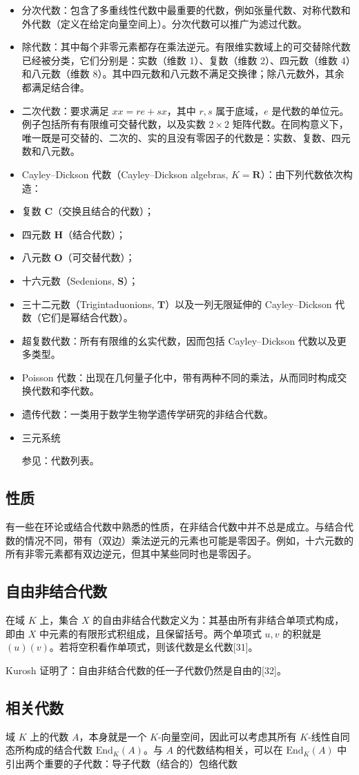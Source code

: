 \begin{itemize}
\item 分次代数：包含了多重线性代数中最重要的代数，例如张量代数、对称代数和外代数（定义在给定向量空间上）。分次代数可以推广为滤过代数。
\item 除代数：其中每个非零元素都存在乘法逆元。有限维实数域上的可交替除代数已经被分类，它们分别是：实数（维数 1）、复数（维数 2）、四元数（维数 4）和八元数（维数 8）。其中四元数和八元数不满足交换律；除八元数外，其余都满足结合律。
\item 二次代数：要求满足 $xx = re + sx$，其中 $r, s$ 属于底域，$e$ 是代数的单位元。例子包括所有有限维可交替代数，以及实数 $2 \times 2$ 矩阵代数。在同构意义下，唯一既是可交替的、二次的、实的且没有零因子的代数是：实数、复数、四元数和八元数。
\item Cayley–Dickson 代数（Cayley–Dickson algebras, $K=\mathbf{R}$）：由下列代数依次构造：
\item 复数 $\mathbf{C}$（交换且结合的代数）；
\item 四元数 $\mathbf{H}$（结合代数）；
\item 八元数 $\mathbf{O}$（可交替代数）；
\item 十六元数（Sedenions, $\mathbf{S}$）；
\item 三十二元数（Trigintaduonions, $\mathbf{T}$）以及一列无限延伸的 Cayley–Dickson 代数（它们是幂结合代数）。
\item 超复数代数：所有有限维的幺实代数，因而包括 Cayley–Dickson 代数以及更多类型。
\item Poisson 代数：出现在几何量子化中，带有两种不同的乘法，从而同时构成交换代数和李代数。
\item 遗传代数：一类用于数学生物学遗传学研究的非结合代数。
\item 三元系统

参见：代数列表。
\end{itemize}
\subsection{性质}
有一些在环论或结合代数中熟悉的性质，在非结合代数中并不总是成立。与结合代数的情况不同，带有（双边）乘法逆元的元素也可能是零因子。例如，十六元数的所有非零元素都有双边逆元，但其中某些同时也是零因子。
\subsection{自由非结合代数}
在域 $K$ 上，集合 $X$ 的自由非结合代数定义为：其基由所有非结合单项式构成，即由 $X$ 中元素的有限形式积组成，且保留括号。两个单项式 $u, v$ 的积就是 $(u)(v)$。若将空积看作单项式，则该代数是幺代数[31]。

Kurosh 证明了：自由非结合代数的任一子代数仍然是自由的[32]。
\subsection{相关代数}
域 $K$ 上的代数 $A$，本身就是一个 $K$-向量空间，因此可以考虑其所有 $K$-线性自同态所构成的结合代数 $\mathrm{End}_K(A)$。与 $A$ 的代数结构相关，可以在 $\mathrm{End}_K(A)$ 中引出两个重要的子代数：导子代数（结合的）包络代数

